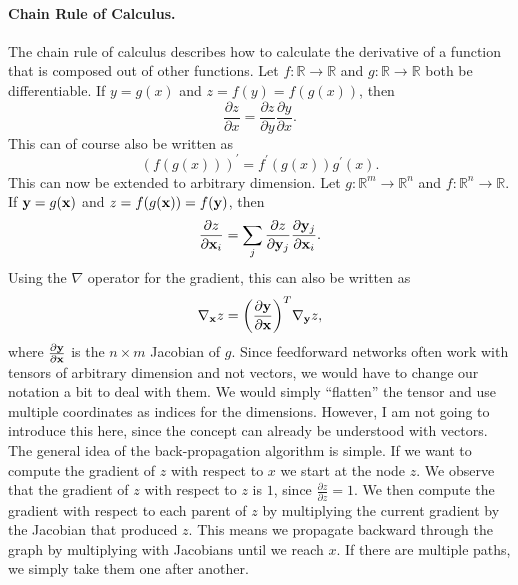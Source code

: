 \paragraph{Chain Rule of Calculus.}
The chain rule of calculus describes how to calculate the derivative of a function that is composed out of other functions.
Let \(f: \mathbb{R} \rightarrow \mathbb{R}\) and \(g: \mathbb{R} \rightarrow \mathbb{R}\) both be differentiable.
If \(y = g(x)\) and \(z = f(y) = f(g(x))\), then
\begin{equation}
    \frac{\partial z}{\partial x} = \frac{\partial z}{\partial y} \frac{\partial y}{\partial x}.
\end{equation}
This can of course also be written as
\begin{equation}
    (f(g(x)))^\prime = f^\prime (g(x)) g^\prime(x).
\end{equation}
This can now be extended to arbitrary dimension.
Let \(g: \mathbb{R}^m \rightarrow \mathbb{R}^n\) and \(f: \mathbb{R}^n \rightarrow \mathbb{R}\).
If \(\mathbf{y} = g(\mathbf{x})\) and \(z = f(g(\mathbf{x})) = f(\mathbf{y})\), then
\begin{equation}
    \frac{\partial z}{\partial \mathbf{x}_{i}} = \sum_{j} \frac{\partial z}{\partial \mathbf{y}_{j}} \frac{\partial \mathbf{y}_{j}}{\partial \mathbf{x}_{i}}.
\end{equation}
Using the \(\nabla\) operator for the gradient, this can also be written as
\begin{equation}
    \label{eq:jacobian-vector-product}
    \nabla_{\mathbf{x}} z = \bigg( \frac{\partial \mathbf{y}}{\partial \mathbf{x}} \bigg)^{T} \nabla_{\mathbf{y}} z,
\end{equation}
where \(\frac{\partial \mathbf{y}}{\partial \mathbf{x}}\) is the \(n \times m\) Jacobian of \(g\).
Since feedforward networks often work with tensors of arbitrary dimension and not vectors, we would have to change our notation a bit to deal with them.
We would simply \enquote{flatten} the tensor and use multiple coordinates as indices for the dimensions.
However, I am not going to introduce this here, since the concept can already be understood with vectors. \\

The general idea of the back-propagation algorithm is simple.
If we want to compute the gradient of \(z\) with respect to \(x\) we start at the node \(z\).
We observe that the gradient of \(z\) with respect to \(z\) is \(1\), since \(\frac{\partial z}{\partial z} = 1\).
We then compute the gradient with respect to each parent of \(z\) by multiplying the current gradient by the Jacobian that produced \(z\).
This means we propagate backward through the graph by multiplying with Jacobians until we reach \(x\).
If there are multiple paths, we simply take them one after another.

